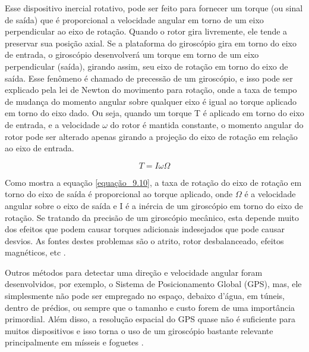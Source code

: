 Esse dispositivo inercial rotativo, pode ser feito para fornecer um torque (ou sinal de saída) que é proporcional a velocidade angular em torno de um eixo perpendicular ao eixo de rotação.
Quando o rotor gira livremente, ele tende a preservar sua posição axial. Se a plataforma do giroscópio gira em torno do eixo de entrada, o giroscópio desenvolverá um torque em torno de um eixo perpendicular (saída), girando assim, seu eixo de rotação em torno do eixo de saída. Esse fenômeno é chamado de precessão de um giroscópio, e isso pode ser explicado pela lei de Newton do movimento para rotação, onde a taxa de tempo de mudança do momento angular sobre qualquer eixo é igual ao torque aplicado em torno do eixo dado. Ou seja, quando um torque T é aplicado em torno do eixo de entrada, e a velocidade $\omega$ do rotor é mantida constante, o momento angular do rotor pode ser alterado apenas girando a projeção do eixo de rotação em relação ao eixo de entrada. 


\begin{equation}
    T = I\omega \Omega
    \label{equação_9.10}
\end{equation}


Como mostra a equação \ref{equação_9.10}, a taxa de rotação do eixo de rotação em torno do eixo de saída é proporcional ao torque aplicado, onde $\Omega$ é a velocidade angular sobre o eixo de saída e I é a inércia de um giroscópio em torno do eixo de rotação. Se tratando da precisão de um giroscópio mecânico, esta depende muito dos efeitos que podem causar torques adicionais indesejados que pode causar desvios. As fontes destes problemas são o atrito, rotor desbalanceado, efeitos magnéticos, etc \cite{ModernSensors}.

Outros métodos para detectar uma direção e velocidade angular foram desenvolvidos, por exemplo, o Sistema de Posicionamento Global (GPS), mas, ele simplesmente não pode ser empregado no espaço, debaixo d'água, em túneis, dentro de prédios, ou sempre que o tamanho e custo forem de uma importância primordial. Além disso, a resolução espacial do GPS quase não é suficiente para muitos dispositivos  e isso torna o uso de um giroscópio bastante relevante principalmente em mísseis e foguetes \cite{Korvink2006}. 
















